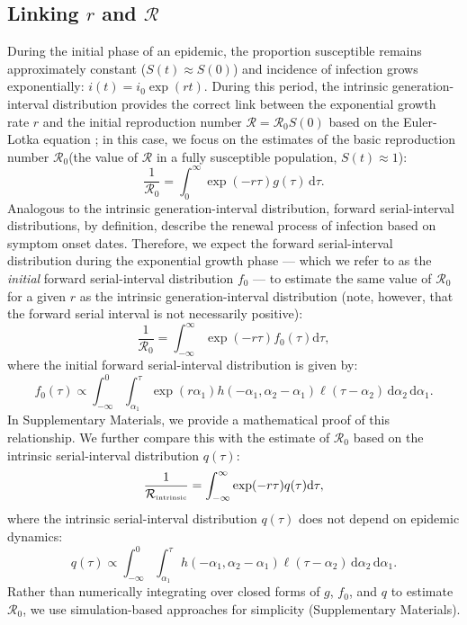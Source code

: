 \documentclass[12pt]{article}
\newcommand{\Rx}[1]{\ensuremath{{\mathcal R}_{#1}}\xspace}
\newcommand{\Ro}{\Rx{0}}
\newcommand{\RR}{\ensuremath{{\mathcal R}}\xspace}
\newcommand{\Rintrinsic}{\ensuremath{{\mathcal R}_{\textrm{\tiny intrinsic}}}\xspace}
\newcommand{\dd}[1]{\ensuremath{\, \mathrm{d}#1}}
\newcommand{\dtau}{\dd{\tau}}
\newcommand{\pinf}{\ensuremath{\alpha_1}} %
\newcommand{\sinf}{\ensuremath{\alpha_2}} %
\newcommand{\idist}{\ell} %
\begin{document}
\subsection{Linking $r$ and \RR}

During the initial phase of an epidemic, the proportion susceptible remains approximately constant ($S(t) \approx S(0)$) and incidence of infection grows exponentially: $i(t)=i_0\exp(rt)$.
During this period, the intrinsic generation-interval distribution provides the correct link between the exponential growth rate $r$ and the initial reproduction number $\RR=\Ro S(0)$ based on the Euler-Lotka equation \citep{wallinga2007generation};
in this case, we focus on the estimates of the basic reproduction number \Ro (the value of \RR in a fully susceptible population, $S(t) \approx 1$):
\begin{equation}
\frac{1}{\Ro} = \int_0^\infty \exp(-r\tau) g(\tau) \dtau.
\label{eq:Rgen}
\end{equation}
Analogous to the intrinsic generation-interval distribution, 
forward serial-interval distributions, by definition, describe the renewal process of infection based on symptom onset dates.
Therefore, we expect the forward serial-interval distribution during the exponential growth phase --- which we refer to as the \emph{initial} forward serial-interval distribution $f_0$ --- to estimate the same value of \Ro for a given $r$ as the intrinsic generation-interval distribution (note, however, that the forward serial interval is not necessarily positive):
\begin{equation}
\frac{1}{\Ro} = \int_{-\infty}^\infty \exp(-r\tau) f_{0}(\tau) \mathrm{d} \tau,
\label{eq:Rforward}
\end{equation}
where the initial forward serial-interval distribution is given by:
\begin{equation}
f_{0}(\tau) \propto \int_{-\infty}^{0} \int_{\pinf}^{\tau} \exp(r \pinf) h(-\pinf, \sinf - \pinf) \idist(\tau - \sinf) \, \mathrm{d}\sinf\,\mathrm{d}\pinf.
\label{eq:initialSI}
\end{equation}
In Supplementary Materials, we provide a mathematical proof of this relationship.
We further compare this with the estimate of \Ro based on the intrinsic serial-interval distribution $q(\tau)$:
\begin{equation}
\frac{1}{\Rintrinsic} = \int_{-\infty}^\infty \exp(-r\tau) q(\tau) \mathrm{d} \tau,
\label{eq:Rintrinsic}
\end{equation}
where the intrinsic serial-interval distribution $q(\tau)$ does not depend on epidemic dynamics:
\begin{equation}
q(\tau) \propto \int_{-\infty}^{0} \int_{\pinf}^{\tau} h(-\pinf, \sinf - \pinf) \idist(\tau - \sinf) \, \mathrm{d}\sinf\,\mathrm{d}\pinf.
\label{eq:intrinsicSI}
\end{equation}
Rather than numerically integrating over closed forms of $g$, $f_0$, and $q$ to estimate $\Ro$, we use simulation-based approaches for simplicity (Supplementary Materials).
\end{document}
